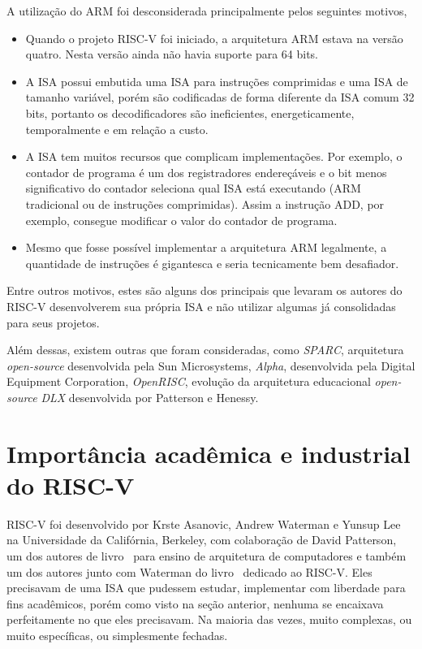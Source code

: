 		A utilização do ARM foi desconsiderada principalmente pelos seguintes motivos,
		\begin{itemize}
			\item Quando o projeto RISC-V foi iniciado, a arquitetura ARM estava na versão quatro. Nesta versão ainda não havia suporte para 64 bits.

			\item A ISA possui embutida uma ISA para instruções comprimidas e uma ISA de tamanho variável, porém são codificadas de forma diferente da ISA comum 32 bits, portanto os decodificadores são ineficientes, energeticamente, temporalmente e em relação a custo.

			\item A ISA tem muitos recursos que complicam implementações. Por exemplo, o contador de programa é um dos registradores endereçáveis e o bit menos significativo do contador seleciona qual ISA está executando (ARM tradicional ou de instruções comprimidas). Assim a instrução ADD, por exemplo, consegue modificar o valor do contador de programa. 

			\item Mesmo que fosse possível implementar a arquitetura ARM legalmente, a quantidade de instruções é gigantesca e seria tecnicamente bem desafiador.   

		\end{itemize}
		Entre outros motivos, estes são alguns dos principais que levaram os autores do RISC-V desenvolverem sua própria ISA e não utilizar algumas já consolidadas para seus projetos.

		Além dessas, existem outras que foram consideradas, como \textit{SPARC}, arquitetura \textit{open-source} desenvolvida pela Sun Microsystems, \textit{Alpha}, desenvolvida pela Digital Equipment Corporation, \textit{OpenRISC}, evolução da arquitetura educacional \textit{open-source} \textit{DLX} desenvolvida por Patterson e Henessy.

	\section{Importância acadêmica e industrial do RISC-V}

		RISC-V foi desenvolvido por Krste Asanovic, Andrew Waterman e Yunsup Lee na Universidade da Califórnia, Berkeley, com colaboração de David Patterson, um dos autores de livro~\cite{computerorganizationanddesign} para ensino de arquitetura de computadores e também um dos autores junto com Waterman do livro~\cite{patterson2017risc} dedicado ao RISC-V. Eles precisavam de uma ISA que pudessem estudar, implementar com liberdade para fins acadêmicos, porém como visto na seção anterior, nenhuma se encaixava perfeitamente no que eles precisavam. Na maioria das vezes, muito complexas, ou muito específicas, ou simplesmente fechadas.

